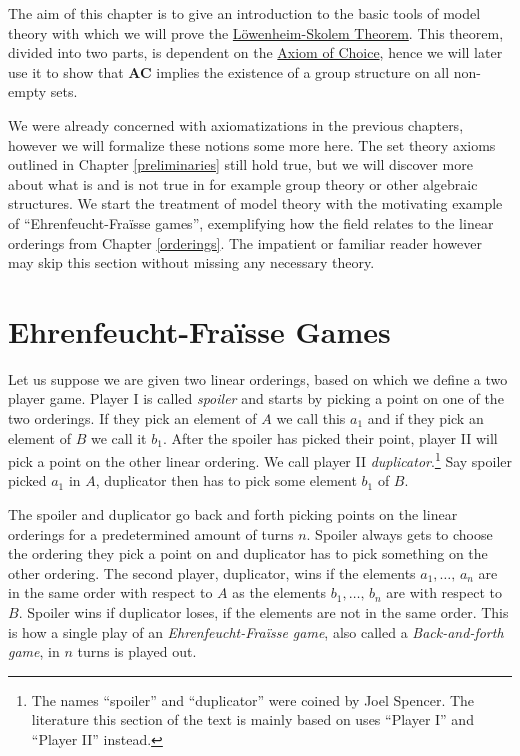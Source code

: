 \documentclass[../../main.tex]{subfiles}
\begin{document}
The aim of this chapter is to give an introduction to the basic tools of model theory with which we will prove the \hyperref[up-lowenheim-skolem]{Löwenheim-Skolem Theorem}.
This theorem, divided into two parts, is dependent on the \hyperref[choice-axiom]{Axiom of Choice}, 
hence we will later use it to show that \textbf{AC} implies the existence of a group structure on all non-empty sets.

We were already concerned with axiomatizations in the previous chapters, however we will formalize these notions some more here.
The set theory axioms outlined in Chapter \ref{preliminaries} still hold true, 
but we will discover more about what is and is not true in for example group theory or other algebraic structures.
We start the treatment of model theory with the motivating example of ``Ehrenfeucht-Fra\"isse games'', 
exemplifying how the field relates to the linear orderings from Chapter \ref{orderings}.
The impatient or familiar reader however may skip this section without missing any necessary theory.

\section{Ehrenfeucht-Fra\"isse Games}
Let us suppose we are given two linear orderings, based on which we define a two player game.
Player I is called \textit{spoiler} and starts by picking a point on one of the two orderings.
If they pick an element of $A$ we call this $a_1$ and if they pick an element of $B$ we call it $b_1$.
After the spoiler has picked their point, player II will pick a point on the other linear ordering. 
We call player II \textit{duplicator}.\footnote{The names ``spoiler'' and ``duplicator'' were coined by Joel Spencer.\cite[\S 6]{Wil24}
The literature \cite{Ros82} this section of the text is mainly based on uses ``Player I'' and ``Player II'' instead.}
Say spoiler picked $a_1$ in $A$, duplicator then has to pick some element $b_1$ of $B$.

The spoiler and duplicator go back and forth picking points on the linear orderings for a predetermined amount of turns $n$.
Spoiler always gets to choose the ordering they pick a point on and duplicator has to pick something on the other ordering.
The second player, duplicator, wins if the elements $a_1,\ldots,\, a_n$ are in the same order with respect to $A$ as the elements $b_1,\ldots,\, b_n$ are with respect to $B$.
Spoiler wins if duplicator loses, if the elements are not in the same order. 
This is how a single play of an \textit{Ehrenfeucht-Fra\"isse game}, also called a \textit{Back-and-forth game}, in $n$ turns is played out. \cite[\S 6.1]{Ros82}
\end{document}
